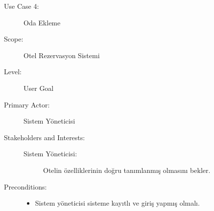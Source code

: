 \documentclass[12pt,a4paper]{report}
\begin{document}
\newpage
\begin{description}
\item[Use Case 4:] Oda Ekleme \\
\item[Scope:] Otel Rezervasyon Sistemi
\item[Level:] User Goal
\item[Primary Actor:] Sistem Yöneticisi 
\item[Stakeholders and Interests:] \hspace{10 mm}
\begin{description} 
\item[Sistem Yöneticisi:] Otelin özelliklerinin doğru tanımlanmış olmasını bekler.
\end{description}
\item[Preconditions:] \hspace{10mm}
\begin{itemize}
\item Sistem yöneticisi sisteme kayıtlı ve giriş yapmış olmalı.
\end{itemize}


\end{description}
\end{document}
